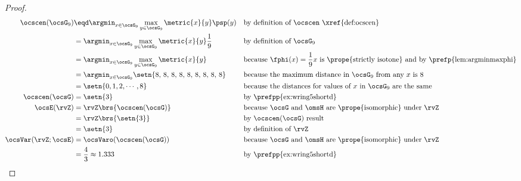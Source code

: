 \begin{tabstr}{0.75}
\begin{proof}
\begin{align*}
  \ocscen(\ocsG_9)
    &\eqd \argmin_{x\in\ocsG_9}\max_{y\in\ocsG_9}\metric{x}{y}\psp(y)
    &&\text{by definition of $\ocscen$ \xref{def:ocscen}}
  \\&= \argmin_{x\in\ocsG_9}\max_{y\in\ocsG_9}\metric{x}{y}\frac{1}{9}
    &&\text{by definition of $\ocsG_9$}
  \\&= \argmin_{x\in\ocsG_9}\max_{y\in\ocsG_9}\metric{x}{y}
    && \text{because $\fphi(x)=\frac{1}{9}x$ is \prope{strictly isotone} and by \prefp{lem:argminmaxphi}}
  \\&= \argmin_{x\in\ocsG_9}\setn{8,\,8,\,8,\,8,\,8,\,8,\,8,\,8,\,8}
    && \text{because the maximum distance in $\ocsG_9$ from any $x$ is $8$}
  \\&= \setn{0,1,2,\cdots,8}
    && \text{because the distances for values of $x$ in $\ocsG_9$ are the same}
  \\
  \ocscen(\ocsG)
    &= \setn{3}
    && \text{by \prefpp{ex:wring5shortd}}
  \\
  \ocsE(\rvZ)
    &= \rvZ\brs{\ocscen(\ocsG)}
    && \text{because $\ocsG$ and $\omsH$ are \prope{isomorphic} under $\rvZ$}
  \\&= \rvZ\brs{\setn{3}}
    && \text{by $\ocscen(\ocsG)$ result}
  \\&= \setn{3}
    && \text{by definition of $\rvZ$}
  \\
  \ocsVar(\rvZ;\ocsE)
    &= \ocsVaro(\ocscen(\ocsG))
    && \text{because $\ocsG$ and $\omsH$ are \prope{isomorphic} under $\rvZ$}
  \\&= \frac{4}{3} \approx 1.333
    && \text{by \prefpp{ex:wring5shortd}}
\end{align*}
\end{proof}



\end{tabstr}
